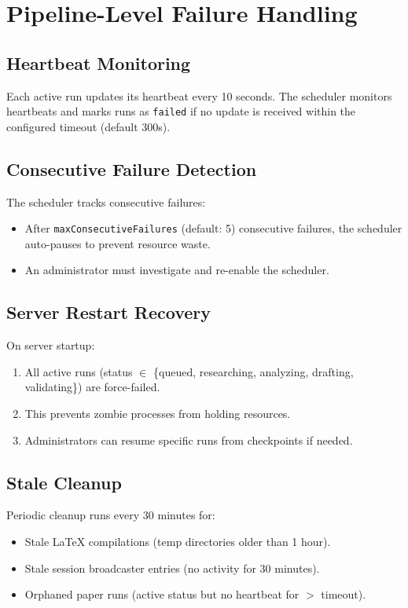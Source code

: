 \section{Pipeline-Level Failure Handling}
\label{sec:failure:pipeline}

\subsection{Heartbeat Monitoring}

Each active run updates its heartbeat every 10 seconds.
The scheduler monitors heartbeats and marks runs as \texttt{failed} if no update is received within the configured timeout (default 300s).

\subsection{Consecutive Failure Detection}

The scheduler tracks consecutive failures:
\begin{itemize}
  \item After \texttt{maxConsecutiveFailures} (default: 5) consecutive failures, the scheduler auto-pauses to prevent resource waste.
  \item An administrator must investigate and re-enable the scheduler.
\end{itemize}

\subsection{Server Restart Recovery}

On server startup:
\begin{enumerate}
  \item All active runs (status $\in$ \{queued, researching, analyzing, drafting, validating\}) are force-failed.
  \item This prevents zombie processes from holding resources.
  \item Administrators can resume specific runs from checkpoints if needed.
\end{enumerate}

\subsection{Stale Cleanup}

Periodic cleanup runs every 30 minutes for:
\begin{itemize}
  \item Stale \LaTeX{} compilations (temp directories older than 1 hour).
  \item Stale session broadcaster entries (no activity for 30 minutes).
  \item Orphaned paper runs (active status but no heartbeat for $>$ timeout).
\end{itemize}

